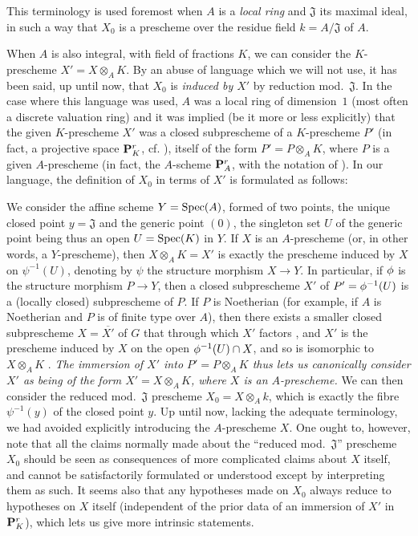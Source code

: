 \begin{env}
\label{1.3.7.2}
This terminology is used foremost when $A$ is a \emph{local ring} and $\mathfrak{J}$ its maximal ideal, in such a way that $X_0$ is a prescheme over the residue field $k=A/\mathfrak{J}$ of $A$.

When $A$ is also integral, with field of fractions $K$, we can consider the $K$-prescheme $X'=X\otimes_A K$.
By an abuse of language which we will not use, it has been said, up until now, that $X_0$ is \emph{induced by $X'$} by reduction mod.~$\mathfrak{J}$.
In the case where this language was used, $A$ was a local ring of dimension~$1$ (most often a discrete valuation ring) and it was implied (be it more or less explicitly) that the given $K$-prescheme $X'$ was a closed subprescheme of a $K$-prescheme $P'$ (in fact, a projective space  $\mathbf{P}_K^r$, cf. ), itself of the form $P'=P\otimes_A K$, where $P$ is a given $A$-prescheme (in fact, the $A$-scheme $\mathbf{P}_A^r$, with the notation of ).
In our language, the definition of $X_0$ in terms of $X'$ is formulated as follows:

We consider the affine scheme $Y=\operatorname{Spec}(A)$, formed of two points, the unique closed point
$y=\mathfrak{J}$ and the generic point $(0)$, the singleton set $U$ of the generic point being thus an open $U=\operatorname{Spec}(K)$ in $Y$.
If $X$ is an $A$-prescheme (or, in other words, a $Y$-prescheme), then $X\otimes_A K=X'$ is exactly the prescheme induced by $X$ on $\psi^{-1}(U)$, denoting by $\psi$ the structure morphism $X\to Y$.
In particular, if $\phi$ is the structure morphism $P\to Y$, then a closed subprescheme $X'$ of $P'=\phi^{-1}(U)$ is a (locally closed) subprescheme of $P$.
If $P$ is Noetherian (for example, if $A$ is Noetherian and $P$ is of finite type over $A$), then there exists a smaller closed subprescheme $X=\overline{X'}$ of $G$ that through which $X'$ factors , and $X'$ is the prescheme induced by $X$ on the open $\phi^{-1}(U)\cap X$, and so is isomorphic to $X\otimes_A K$ .
\emph{The immersion of $X'$ into $P'=P\otimes_A K$ thus lets us canonically consider $X'$ as being of the form $X'=X\otimes_A K$, where $X$ is an $A$-prescheme.}
We can then consider the reduced mod.~$\mathfrak{J}$ prescheme $X_0=X\otimes_A k$, which is exactly the fibre $\psi^{-1}(y)$ of the closed point $y$.
Up until now, lacking the adequate terminology, we had avoided explicitly introducing the $A$-prescheme $X$.
One ought to, however, note that all the claims normally made about the ``reduced mod.~$\mathfrak{J}$'' prescheme  $X_0$ should be seen as consequences of more complicated claims about $X$ itself, and cannot be satisfactorily formulated or understood except by interpreting them as such.
It seems also that any hypotheses made on $X_0$ always reduce to hypotheses on $X$ itself (independent of the prior data of an immersion of $X'$ in $\mathbf{P}_K^r$), which lets us give more intrinsic statements.
\end{env}

